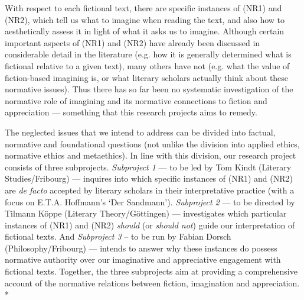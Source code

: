 \noindent With respect to each fictional text, there are specific instances of (NR1) and (NR2), which tell us what to imagine when reading the text, and also how to aesthetically assess it in light of what it asks us to imagine. Although certain important aspects of (NR1) and (NR2) have already been discussed in considerable detail in the literature (e.g. how it is generally determined what is fictional relative to a given text), many others have not (e.g. what the value of fiction-based imagining is, or what literary scholars actually think about these normative issues). Thus there has so far been no systematic investigation of the normative role of imagining and its normative connections to fiction and appreciation --- something that this research projects aims to remedy. 

The neglected issues that we intend to address can be divided into factual, normative and foundational questions (not unlike the division into applied ethics, normative ethics and metaethics). In line with this division, our research project consists of three subprojects. \emph{Subproject 1} --- to be led by Tom Kindt (Literary Studies/Fribourg) --- inquires into which specific instances of (NR1) and (NR2) are \emph{de facto} accepted by literary scholars in their interpretative practice (with a focus on E.T.A. Hoffmann's `Der Sandmann'). \emph{Subproject 2} --- to be directed by Tilmann K\"oppe (Literary Theory/G\"ottingen) --- investigates which particular instances of (NR1) and (NR2) \emph{should} (or \emph{should not}) guide our interpretation of fictional texts. And \emph{Subproject 3} -- to be run by Fabian Dorsch (Philosophy/Fribourg) --- intends to answer why these instances do possess normative authority over our imaginative and appreciative engagement with fictional texts. Together, the three subprojects aim at providing a comprehensive account of the normative relations between fiction, imagination and appreciation. *

\pagebreak